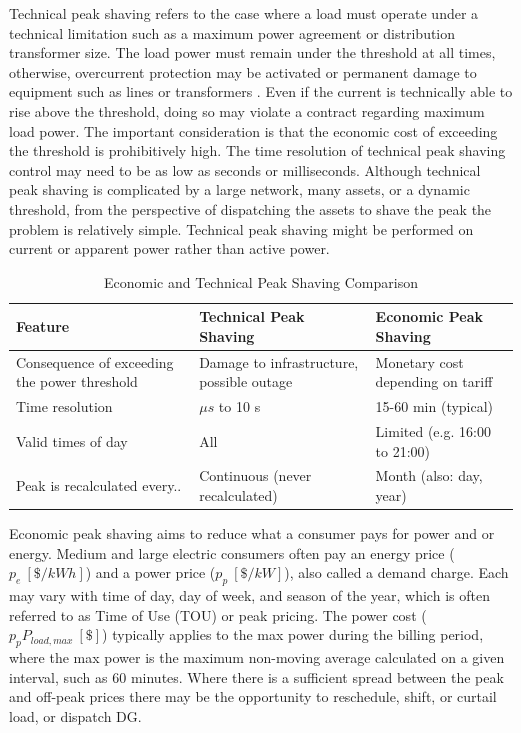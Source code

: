\documentclass[journal,article,submit,pdftex,moreauthors]{Definitions/mdpi}
\begin{document}
Technical peak shaving refers to the case where a load must operate under a technical limitation such as a maximum power agreement or distribution transformer size. The load power must remain under the threshold at all times, otherwise, overcurrent protection may be activated or permanent damage to equipment such as lines or transformers \cite{Greco2023}. Even if the current is technically able to rise above the threshold, doing so may violate a contract regarding maximum load power. The important consideration is that the economic cost of exceeding the threshold is prohibitively high. The time resolution of technical peak shaving control may need to be as low as seconds or milliseconds. Although technical peak shaving is complicated by a large network, many assets, or a dynamic threshold, from the perspective of dispatching the assets to shave the peak the problem is relatively simple. Technical peak shaving might be performed on current or apparent power rather than active power.

\begin{table}
  \caption{Economic and Technical Peak Shaving Comparison}
  \label{tab:econ-tech-peak-shaving}
  \begin{tabularx}{\linewidth}{X X X}
    \toprule
    Feature                                      & Technical Peak Shaving                    & Economic Peak Shaving             \\
    \midrule
    Consequence of exceeding the power threshold & Damage to infrastructure, possible outage & Monetary cost depending on tariff \\
    Time resolution                              & $\mu s$ to 10 s                           & 15-60 min (typical)               \\
    Valid times of day                           & All                                       & Limited (e.g. 16:00 to 21:00)     \\
    Peak is recalculated every..                 & Continuous (never recalculated)           & Month (also: day, year)           \\
    \bottomrule
  \end{tabularx}
\end{table}


Economic peak shaving aims to reduce what a consumer pays for power and or energy. Medium and large electric consumers often pay an energy price ($p_e\ [\$/kWh]$) and a power price ($p_p\ [\$/kW]$), also called a demand charge. Each may vary with time of day, day of week, and season of the year, which is often referred to as Time of Use (TOU) or peak pricing. The power cost ($p_p P_{load,max}\ [\$]$) typically applies to the max power during the billing period, where the max power is the maximum non-moving average calculated on a given interval, such as 60 minutes. Where there is a sufficient spread between the peak and off-peak prices there may be the opportunity to reschedule, shift, or curtail load, or dispatch DG.
\end{document}
